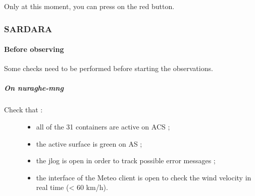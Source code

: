 \documentclass[letterpaper,10pt,english]{sphinxmanual}
\begin{document}
Only at this moment, you can press on the red button.


\subsubsection{SARDARA}
\label{Continuum/L-band/SARDARA/index:sardara}\label{Continuum/L-band/SARDARA/index::doc}

\paragraph{Before observing}
\label{Continuum/L-band/SARDARA/before-obs:before-observing}\label{Continuum/L-band/SARDARA/before-obs::doc}
Some checks need to be performed before starting the observations.


\subparagraph{On nuraghe-mng}
\label{Continuum/L-band/SARDARA/before-obs:on-nuraghe-mng}\begin{description}
\item[{Check that :}] \leavevmode\begin{itemize}
\item {} 
all of the 31 containers are active on ACS ;

\item {} 
the active surface is green on AS ;

\item {} 
the jlog is open in order to track possible error messages ;

\item {} 
the interface of the Meteo client is open to check the wind velocity in real time (\textless{} 60 km/h).

\end{itemize}

\end{description}
\end{document}
